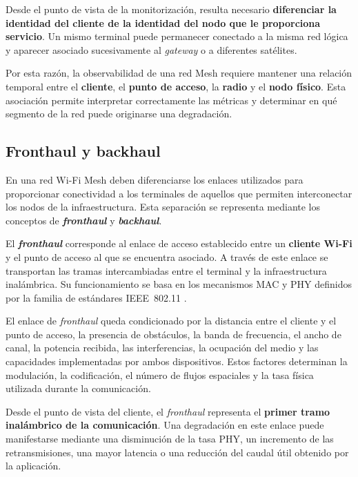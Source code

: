 Desde el punto de vista de la monitorización, resulta necesario
\textbf{diferenciar la identidad del cliente de la identidad del nodo que
le proporciona servicio}. Un mismo terminal puede permanecer conectado a
la misma red lógica y aparecer asociado sucesivamente al
\textit{gateway} o a diferentes satélites.

Por esta razón, la observabilidad de una red Mesh requiere mantener una
relación temporal entre el \textbf{cliente}, el \textbf{punto de acceso},
la \textbf{radio} y el \textbf{nodo físico}. Esta asociación permite
interpretar correctamente las métricas y determinar en qué segmento de
la red puede originarse una degradación.

\subsection{Fronthaul y backhaul}
\label{subsec:fronthaul-backhaul}

En una red Wi-Fi Mesh deben diferenciarse los enlaces utilizados para
proporcionar conectividad a los terminales de aquellos que permiten
interconectar los nodos de la infraestructura. Esta separación se
representa mediante los conceptos de \textbf{\textit{fronthaul}} y
\textbf{\textit{backhaul}}.

El \textbf{\textit{fronthaul}} corresponde al enlace de acceso
establecido entre un \textbf{cliente Wi-Fi} y el punto de acceso al que
se encuentra asociado. A través de este enlace se transportan las tramas
intercambiadas entre el terminal y la infraestructura inalámbrica. Su
funcionamiento se basa en los mecanismos MAC y PHY definidos por la
familia de estándares IEEE~802.11 \cite{ieee_80211_2024}.

El enlace de \textit{fronthaul} queda condicionado por la distancia entre
el cliente y el punto de acceso, la presencia de obstáculos, la banda de
frecuencia, el ancho de canal, la potencia recibida, las interferencias,
la ocupación del medio y las capacidades implementadas por ambos
dispositivos. Estos factores determinan la modulación, la codificación,
el número de flujos espaciales y la tasa física utilizada durante la
comunicación.

Desde el punto de vista del cliente, el \textit{fronthaul} representa el
\textbf{primer tramo inalámbrico de la comunicación}. Una degradación en
este enlace puede manifestarse mediante una disminución de la tasa PHY,
un incremento de las retransmisiones, una mayor latencia o una reducción
del caudal útil obtenido por la aplicación.

